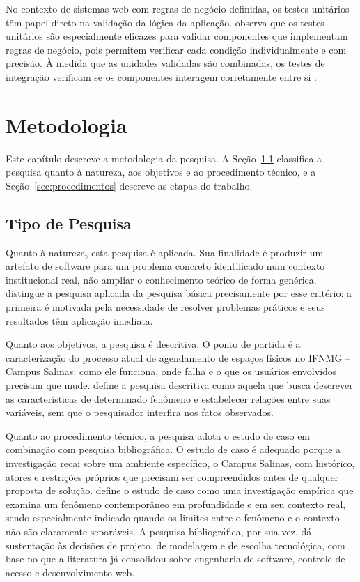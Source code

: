 \documentclass[
	12pt,				%
	twoside,			%
	openany,			%
	a4paper,			%
	chapter=TITLE,		%
	section=TITLE,		%
	subsection=TITLE,	%
	subsubsection=TITLE,%
	english,			%
	french,				%
	spanish,			%
	brazil,				%
	]{abntex2}
\begin{document}
No contexto de sistemas web com regras de negócio definidas, os testes unitários têm papel direto na validação da lógica da aplicação.  observa que os testes unitários são especialmente eficazes para validar componentes que implementam regras de negócio, pois permitem verificar cada condição individualmente e com precisão. À medida que as unidades validadas são combinadas, os testes de integração verificam se os componentes interagem corretamente entre si \cite{pressman2016}.

\section{Metodologia}
\label{sec:metodologia}

Este capítulo descreve a metodologia da pesquisa. A Seção~\ref{sec:tipopesquisa} classifica a pesquisa quanto à natureza, aos objetivos e ao procedimento técnico, e a Seção~\ref{sec:procedimentos} descreve as etapas do trabalho.

\subsection{Tipo de Pesquisa}
\label{sec:tipopesquisa}

Quanto à natureza, esta pesquisa é aplicada. Sua finalidade é produzir um artefato de software para um problema concreto identificado num contexto institucional real, não ampliar o conhecimento teórico de forma genérica.  distingue a pesquisa aplicada da pesquisa básica precisamente por esse critério: a primeira é motivada pela necessidade de resolver problemas práticos e seus resultados têm aplicação imediata.

Quanto aos objetivos, a pesquisa é descritiva. O ponto de partida é a caracterização do processo atual de agendamento de espaços físicos no IFNMG -- Campus Salinas: como ele funciona, onde falha e o que os usuários envolvidos precisam que mude.  define a pesquisa descritiva como aquela que busca descrever as características de determinado fenômeno e estabelecer relações entre suas variáveis, sem que o pesquisador interfira nos fatos observados.

Quanto ao procedimento técnico, a pesquisa adota o estudo de caso em combinação com pesquisa bibliográfica. O estudo de caso é adequado porque a investigação recai sobre um ambiente específico, o Campus Salinas, com histórico, atores e restrições próprios que precisam ser compreendidos antes de qualquer proposta de solução.  define o estudo de caso como uma investigação empírica que examina um fenômeno contemporâneo em profundidade e em seu contexto real, sendo especialmente indicado quando os limites entre o fenômeno e o contexto não são claramente separáveis. A pesquisa bibliográfica, por sua vez, dá sustentação às decisões de projeto, de modelagem e de escolha tecnológica, com base no que a literatura já consolidou sobre engenharia de software, controle de acesso e desenvolvimento web.
\end{document}
